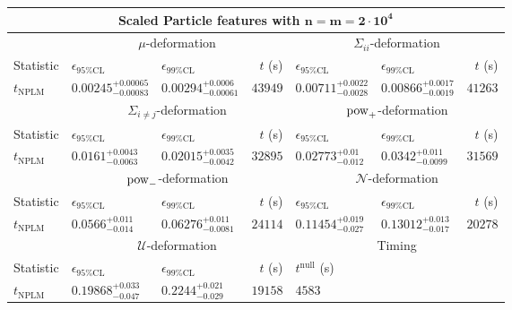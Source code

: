 \begin{tabular}{l|llr|llr}
	\toprule
	\multicolumn{7}{c}{{\bf Scaled Particle features with $\mathbf{n=m=2\cdot 10^{4}}$}} \\
	\toprule
	\multicolumn{1}{c}{} & \multicolumn{3}{c}{$\mu$-deformation} & \multicolumn{3}{c}{$\Sigma_{ii}$-deformation} \\
	Statistic & $\epsilon_{95\%\mathrm{CL}}$ & $\epsilon_{99\%\mathrm{CL}}$ & $t$ (s) & $\epsilon_{95\%\mathrm{CL}}$ & $\epsilon_{99\%\mathrm{CL}}$ & $t$ (s) \\
	\midrule
	$t_{\mathrm{NPLM}}$ & $0.00245_{-0.00083}^{+0.00065}$ & $0.00294_{-0.00061}^{+0.0006}$ & $43949$ & $0.00711_{-0.0028}^{+0.0022}$ & $0.00866_{-0.0019}^{+0.0017}$ & $41263$ \\
	\toprule
	\multicolumn{1}{c}{} & \multicolumn{3}{c}{$\Sigma_{i\neq j}$-deformation} & \multicolumn{3}{c}{$\rm{pow}_{+}$-deformation} \\
	Statistic & $\epsilon_{95\%\mathrm{CL}}$ & $\epsilon_{99\%\mathrm{CL}}$ & $t$ (s) & $\epsilon_{95\%\mathrm{CL}}$ & $\epsilon_{99\%\mathrm{CL}}$ & $t$ (s) \\
	\midrule
	$t_{\mathrm{NPLM}}$ & $0.0161_{-0.0063}^{+0.0043}$ & $0.02015_{-0.0042}^{+0.0035}$ & $32895$ & $0.02773_{-0.012}^{+0.01}$ & $0.0342_{-0.0099}^{+0.011}$ & $31569$ \\
	\toprule
	\multicolumn{1}{c}{} & \multicolumn{3}{c}{$\rm{pow}_{-}$-deformation} & \multicolumn{3}{c}{$\mathcal{N}$-deformation} \\
	Statistic & $\epsilon_{95\%\mathrm{CL}}$ & $\epsilon_{99\%\mathrm{CL}}$ & $t$ (s) & $\epsilon_{95\%\mathrm{CL}}$ & $\epsilon_{99\%\mathrm{CL}}$ & $t$ (s) \\
	\midrule
	$t_{\mathrm{NPLM}}$ & $0.0566_{-0.014}^{+0.011}$ & $0.06276_{-0.0081}^{+0.011}$ & $24114$ & $0.11454_{-0.027}^{+0.019}$ & $0.13012_{-0.017}^{+0.013}$ & $20278$ \\
	\toprule
	\multicolumn{1}{c}{} & \multicolumn{3}{c}{$\mathcal{U}$-deformation} & \multicolumn{3}{c}{Timing} \\
	Statistic & $\epsilon_{95\%\mathrm{CL}}$ & $\epsilon_{99\%\mathrm{CL}}$ & $t$ (s) & $t^{\mathrm{null}}$ (s) \\
	\midrule
	$t_{\mathrm{NPLM}}$ & $0.19868_{-0.047}^{+0.033}$ & $0.2244_{-0.029}^{+0.021}$ & $19158$ & $4583$ \\
	\bottomrule
\end{tabular}